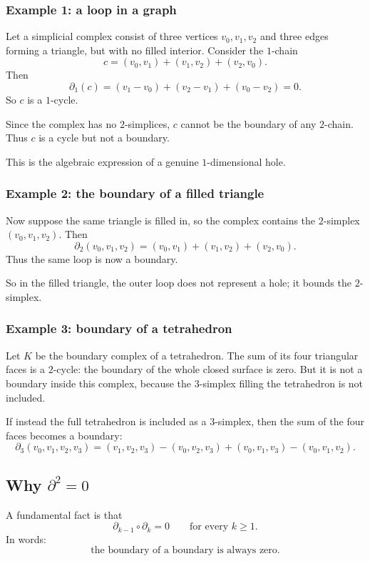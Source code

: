 \documentclass[12pt,a4paper]{article}
\theoremstyle{notespace}
\begin{document}
\subsubsection*{Example 1: a loop in a graph}

Let a simplicial complex consist of three vertices \(v_0,v_1,v_2\) and three edges forming a triangle, but with no filled interior. Consider the \(1\)-chain
\[
c=(v_0,v_1)+(v_1,v_2)+(v_2,v_0).
\]
Then
\[
\partial_1(c)
=
(v_1-v_0)+(v_2-v_1)+(v_0-v_2)=0.
\]
So \(c\) is a \(1\)-cycle.

Since the complex has no \(2\)-simplices, \(c\) cannot be the boundary of any \(2\)-chain. Thus \(c\) is a cycle but not a boundary.

This is the algebraic expression of a genuine \(1\)-dimensional hole.

\subsubsection*{Example 2: the boundary of a filled triangle}

Now suppose the same triangle is filled in, so the complex contains the \(2\)-simplex \((v_0,v_1,v_2)\). Then
\[
\partial_2(v_0,v_1,v_2)
=
(v_0,v_1)+(v_1,v_2)+(v_2,v_0).
\]
Thus the same loop is now a boundary.

So in the filled triangle, the outer loop does not represent a hole; it bounds the \(2\)-simplex.

\subsubsection*{Example 3: boundary of a tetrahedron}

Let \(K\) be the boundary complex of a tetrahedron. The sum of its four triangular faces is a \(2\)-cycle: the boundary of the whole closed surface is zero. But it is not a boundary inside this complex, because the \(3\)-simplex filling the tetrahedron is not included.

If instead the full tetrahedron is included as a \(3\)-simplex, then the sum of the four faces becomes a boundary:
\[
\partial_3(v_0,v_1,v_2,v_3)
=
(v_1,v_2,v_3)
-(v_0,v_2,v_3)
+(v_0,v_1,v_3)
-(v_0,v_1,v_2).
\]

\subsection{Why \(\partial^2=0\)}

A fundamental fact is that
\[
\partial_{k-1}\circ \partial_k = 0
\qquad \text{for every } k\ge 1.
\]
In words:
\[
\text{the boundary of a boundary is always zero.}
\]
\end{document}
